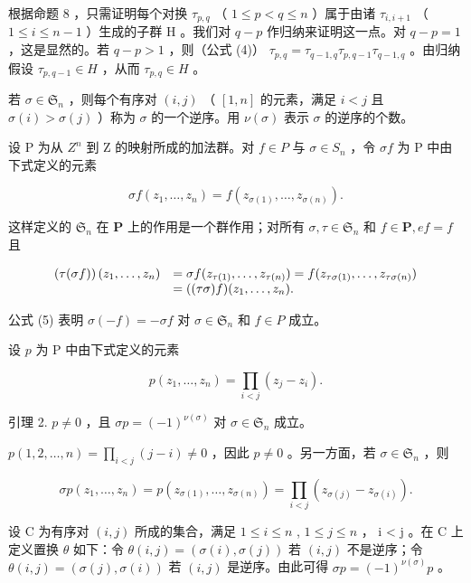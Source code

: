 根据命题 8 ，只需证明每个对换 \(\tau_{p,q}\) （ \(1 \leqslant p < q \leqslant n\) ）属于由诸 \(\tau_{i,i+1}\) （ \(1 \leqslant i \leqslant n-1\) ）生成的子群 H 。我们对 \(q-p\) 作归纳来证明这一点。对 \(q-p=1\) ，这是显然的。若 \(q-p>1\) ，则（公式 (4)） \(\tau_{p,q} = \tau_{q-1,q}\tau_{p,q-1}\tau_{q-1,q}\) 。由归纳假设 \(\tau_{p,q-1} \in H\) ，从而 \(\tau_{p,q} \in H\) 。

若 \(\sigma \in \mathfrak{S}_n\) ，则每个有序对 \((i,j)\) （ \([1,n]\) 的元素，满足 \(i < j\) 且 \(\sigma(i) > \sigma(j)\) ）称为 \(\sigma\) 的一个逆序。用 \(\nu(\sigma)\) 表示 \(\sigma\) 的逆序的个数。

设 P 为从 \(Z^{n}\) 到 Z 的映射所成的加法群。对 \(f \in P\) 与 \(\sigma \in S_{n}\) ，令 \(\sigma f\) 为 P 中由下式定义的元素

\[
\sigma f (z _ {1}, \dots , z _ {n}) = f (z _ {\sigma (1)}, \dots , z _ {\sigma (n)}).\tag{5}
\]

这样定义的 \(\mathfrak{S}_n\) 在 \(\mathbf{P}\) 上的作用是一个群作用；对所有 \(\sigma, \tau \in \mathfrak{S}_n\) 和 \(f \in \mathbf{P}, ef = f\) 且

\[
\begin{array}{r l} \left(\tau (\sigma f)\right) (z _ {1}, \dots , z _ {n}) & = \sigma f (z _ {\tau (1)}, \dots , z _ {\tau (n)}) = f (z _ {\tau \sigma (1)}, \dots , z _ {\tau \sigma (n)}) \\ & = ((\tau \sigma) f) (z _ {1}, \dots , z _ {n}). \end{array}
\]

公式 (5) 表明 \(\sigma(-f) = -\sigma f\) 对 \(\sigma \in \mathfrak{S}_n\) 和 \(f \in P\) 成立。

设 \(p\) 为 P 中由下式定义的元素

\[
p (z _ {1}, \dots , z _ {n}) = \prod_ {i <   j} (z _ {j} - z _ {i}).\tag{6}
\]

引理 2. \(p \neq 0\) ，且 \(\sigma p = (-1)^{\nu(\sigma)}\) 对 \(\sigma \in \mathfrak{S}_n\) 成立。

\(p(1,2,\ldots,n) = \prod_{i < j}(j - i)\neq 0\) ，因此 \(p\neq 0\) 。另一方面，若 \(\sigma \in \mathfrak{S}_n\) ，则

\[
\sigma p (z _ {1}, \dots , z _ {n}) = p (z _ {\sigma (1)}, \dots , z _ {\sigma (n)}) = \prod_ {i <   j} (z _ {\sigma (j)} - z _ {\sigma (i)}).
\]

设 C 为有序对 \((i,j)\) 所成的集合，满足 \(1 \leqslant i \leqslant n\) , \(1 \leqslant j \leqslant n\) ， i \textless{} j 。在 C 上定义置换 \(\theta\) 如下：令 \(\theta(i,j) = (\sigma(i), \sigma(j))\) 若 \((i,j)\) 不是逆序；令 \(\theta(i,j) = (\sigma(j), \sigma(i))\) 若 \((i,j)\) 是逆序。由此可得 \(\sigma p = (-1)^{\nu(\sigma)} p\) 。

